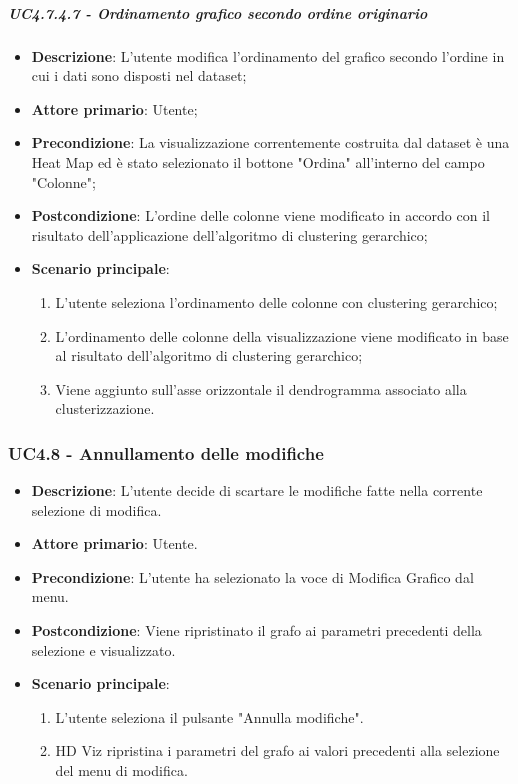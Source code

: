 \subparagraph{UC4.7.4.7 - Ordinamento grafico secondo ordine originario }
\label{spar:uc4.7.4.7}
\begin{itemize}
    \item \textbf{Descrizione}:     L'utente modifica l'ordinamento del grafico secondo l'ordine in cui i dati sono disposti nel dataset;
    \item \textbf{Attore primario}: Utente;
    \item \textbf{Precondizione}:   La visualizzazione correntemente costruita dal dataset è una Heat Map ed è stato selezionato il bottone "Ordina" all'interno del campo "Colonne";
    \item \textbf{Postcondizione}:  L'ordine delle colonne viene modificato in accordo con il risultato dell'applicazione dell'algoritmo di clustering gerarchico;
    \item \textbf{Scenario principale}:
    \begin{enumerate}
        \item L'utente seleziona l'ordinamento delle colonne con clustering gerarchico;
        \item L'ordinamento delle colonne della visualizzazione viene modificato in base al risultato dell'algoritmo di clustering gerarchico;
        \item Viene aggiunto sull'asse orizzontale il dendrogramma associato alla clusterizzazione.
    \end{enumerate}
\end{itemize}



\subsubsection{UC4.8 - Annullamento delle modifiche}
\label{ssub:uc4.8}
\begin{itemize}
    \item \textbf{Descrizione}: L'utente decide di scartare le modifiche fatte nella corrente selezione di modifica.

    \item \textbf{Attore primario}: Utente.

    \item \textbf{Precondizione}:   L'utente ha selezionato la voce di Modifica Grafico dal menu.
    \item \textbf{Postcondizione}:  Viene ripristinato il grafo ai parametri precedenti della selezione e visualizzato.

	\item \textbf{Scenario principale}:
        \begin{enumerate}

            \item L'utente seleziona il pulsante "Annulla modifiche".
            \item HD Viz ripristina i parametri del grafo ai valori precedenti alla selezione del menu di modifica.

        \end{enumerate}
\end{itemize}
